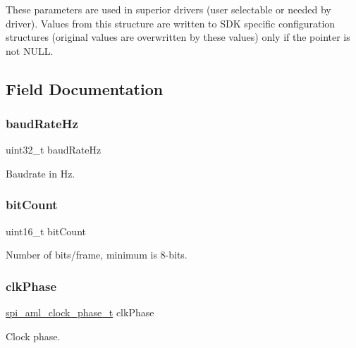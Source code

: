 These parameters are used in superior drivers (user selectable or needed by driver). Values from this structure are written to S\+DK specific configuration structures (original values are overwritten by these values) only if the pointer is not N\+U\+LL. 

\subsection{Field Documentation}
\mbox{\label{structspi__aml__master__config__t_a6d3034fecd72dea96793c13f8c6340cd}} 
\subsubsection{\texorpdfstring{baudRateHz}{baudRateHz}}
{\footnotesize\ttfamily uint32\+\_\+t baud\+Rate\+Hz}

Baudrate in Hz. \mbox{\label{structspi__aml__master__config__t_afcc9f66e274f7e690549d5d216970d73}} 
\subsubsection{\texorpdfstring{bitCount}{bitCount}}
{\footnotesize\ttfamily uint16\+\_\+t bit\+Count}

Number of bits/frame, minimum is 8-\/bits. \mbox{\label{structspi__aml__master__config__t_a8369385e8658ba5c7a74897397ce0a85}} 
\subsubsection{\texorpdfstring{clkPhase}{clkPhase}}
{\footnotesize\ttfamily \mbox{\hyperlink{group__enum__group_gaa95bcc4aa184cc2df42df55e6d8c2d3a}{spi\+\_\+aml\+\_\+clock\+\_\+phase\+\_\+t}} clk\+Phase}

Clock phase. \mbox{\label{structspi__aml__master__config__t_a732dd1442ee0b3aa8d353fcd9d84a99f}} 
